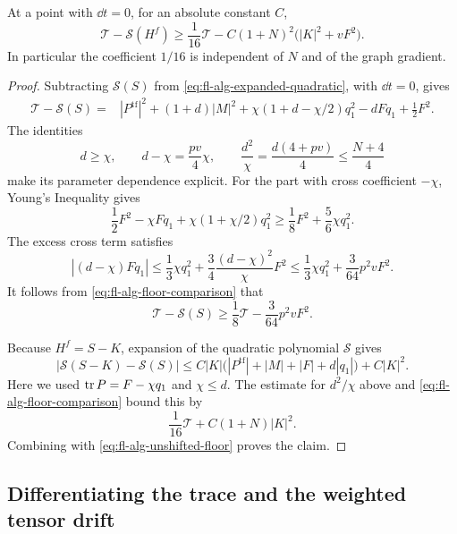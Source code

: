 \begin{lemma}
\label{lem:fl-alg-floor-coercivity}
At a point with \(\dd t=0\), for an absolute constant \(C\),
\begin{equation}
 \mathcal T-\mathcal S(H^f)
 \ge \frac1{16}\mathcal T
        -C(1+N)^2\bigl(|K|^2+vF^2\bigr).
 \label{eq:fl-alg-floor-coercivity}
\end{equation}
In particular the coefficient \(1/16\) is independent of \(N\) and
of the graph gradient.
\end{lemma}

\begin{proof}
Subtracting \(\mathcal S(S)\) from
\eqref{eq:fl-alg-expanded-quadratic}, with \(\dd t=0\), gives
\begin{align}
 \mathcal T-\mathcal S(S)
  ={}&|P^{\mathrm{tf}}|^2+(1+d)|M|^2
       +\chi(1+d-\chi/2)q_1^2-dFq_1+\frac12F^2.
 \label{eq:fl-alg-floor-difference}
\end{align}
The identities
\[
 d\ge\chi,\qquad d-\chi=\frac{pv}{4}\chi,\qquad
 \frac{d^2}{\chi}=\frac{d(4+pv)}4\le\frac{N+4}{4}
\]
make its parameter dependence explicit.
For the part with cross coefficient \(-\chi\), Young's Inequality gives
\[
 \frac12F^2-\chi Fq_1+\chi(1+\chi/2)q_1^2
       \ge\frac18F^2+\frac56\chi q_1^2.
\]
The excess cross term satisfies
\[
 |(d-\chi)Fq_1|
 \le\frac13\chi q_1^2
           +\frac34\frac{(d-\chi)^2}{\chi}F^2
 \le\frac13\chi q_1^2+\frac3{64}p^2vF^2.
\]
It follows from \eqref{eq:fl-alg-floor-comparison} that
\begin{equation}
 \mathcal T-\mathcal S(S)
       \ge\frac18\mathcal T-\frac3{64}p^2vF^2.
 \label{eq:fl-alg-unshifted-floor}
\end{equation}

Because \(H^f=S-K\), expansion of the quadratic polynomial
\(\mathcal S\) gives
\[
 |\mathcal S(S-K)-\mathcal S(S)|
 \le C|K|\bigl(|P^{\mathrm{tf}}|+|M|+|F|+d|q_1|\bigr)+C|K|^2.
\]
Here we used \(\operatorname{tr} P=F-\chi q_1\) and \(\chi\le d\).
The estimate for \(d^2/\chi\) above and
\eqref{eq:fl-alg-floor-comparison} bound this by
\[
 \frac1{16}\mathcal T+C(1+N)|K|^2.
\]
Combining with \eqref{eq:fl-alg-unshifted-floor} proves the claim.
\end{proof}

\subsection{Differentiating the trace and the weighted tensor drift}
\label{sec:fl-alg-derivatives}

